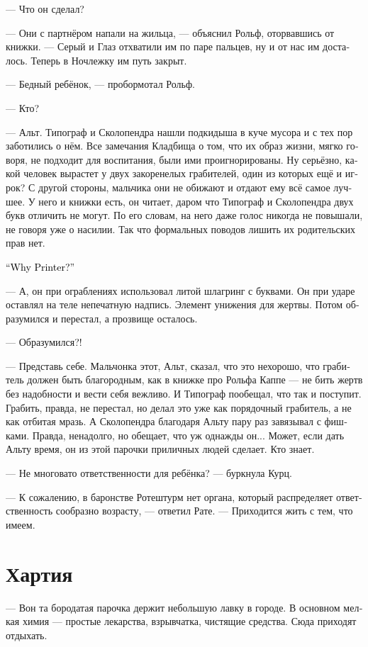 \documentclass[a4paper,12pt,fleqn]{book}\usepackage{cooltooltips}\usepackage{polyglossia}\setdefaultlanguage[babelshorthands=true]{russian}\setotherlanguage{english}\defaultfontfeatures{Ligatures=TeX,Mapping=tex-text} \usepackage{xcolor}\definecolor{lightgray}{HTML}{bbbbbb}\color{lightgray}\newcommand{\ml}[3]{\textenglish{\textcolor{black}{#3}}}
\begin{document}
--- Что он сделал?

--- Они с партнёром напали на жильца, --- объяснил Рольф, оторвавшись от книжки.
--- Серый и Глаз отхватили им по паре пальцев, ну и от нас им досталось.
Теперь в Ночлежку им путь закрыт.

--- Бедный ребёнок, --- пробормотал Рольф.

--- Кто?

--- Альт.
Типограф и Сколопендра нашли подкидыша в куче мусора и с тех пор заботились о нём.
Все замечания Кладбища о том, что их образ жизни, мягко говоря, не подходит для воспитания, были ими проигнорированы.
Ну серьёзно, какой человек вырастет у двух закоренелых грабителей, один из которых ещё и игрок?
С другой стороны, мальчика они не обижают и отдают ему всё самое лучшее.
У него и книжки есть, он читает, даром что Типограф и Сколопендра двух букв отличить не могут.
По его словам, на него даже голос никогда не повышали, не говоря уже о насилии.
Так что формальных поводов лишить их родительских прав нет.

\ml{$0$}
{--- А почему Типограф?}
{``Why Printer?''}

--- А, он при ограблениях использовал литой шлагринг с буквами.
Он при ударе оставлял на теле непечатную надпись.
Элемент унижения для жертвы.
Потом образумился и перестал, а прозвище осталось.

--- Образумился?!

--- Представь себе.
Мальчонка этот, Альт, сказал, что это нехорошо, что грабитель должен быть благородным, как в книжке про Рольфа Каппе --- не бить жертв без надобности и вести себя вежливо.
И Типограф пообещал, что так и поступит.
Грабить, правда, не перестал, но делал это уже как порядочный грабитель, а не как отбитая мразь.
А Сколопендра благодаря Альту пару раз завязывал с фишками.
Правда, ненадолго, но обещает, что уж однажды он...
Может, если дать Альту время, он из этой парочки приличных людей сделает.
Кто знает.

--- Не многовато ответственности для ребёнка? --- буркнула Курц.

--- К сожалению, в баронстве Ротештурм нет органа, который распределяет ответственность сообразно возрасту, --- ответил Рате.
--- Приходится жить с тем, что имеем.

\section{Хартия}

--- Вон та бородатая парочка держит небольшую лавку в городе.
В основном мелкая химия --- простые лекарства, взрывчатка, чистящие средства.
Сюда приходят отдыхать.
\end{document}
